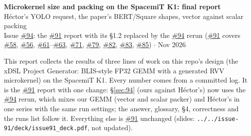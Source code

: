 \documentclass[10pt,a4paper]{article}
\newcommand{\iss}[1]{\href{https://github.com/JieGH/RVV_code_gen_via_MLIR_xDSL/issues/#1}{\##1}}
\begin{document}
\begin{center}
{\Large\bfseries Microkernel size and packing on the SpacemiT K1: final report}\\[4pt]
H\'ector's YOLO request, the paper's BERT/Square shapes, vector against scalar packing\\[2pt]
Issue \iss{94}: the \iss{91} report with its \S1.2 replaced by the \iss{94} rerun (\iss{91} covers \iss{58}, \iss{56}, \iss{61}--\iss{63}, \iss{71}, \iss{79}, \iss{82}, \iss{83}, \iss{85}) \quad$\cdot$ Nov 2026
\end{center}

\noindent This report collects the results of three lines of work on this repo's design (the xDSL Project Generator:
BLIS-style FP32 GEMM with a generated RVV microkernel) on the SpacemiT K1. Every number comes from a committed log. It is the \iss{91} report with one change: \S\ref{sec:94} (ours against H\'ector's) now uses the \iss{94} rerun, which mixes our GEMM (vector and scalar packer) and H\'ector's in one series with the same run settings; the answer, glossary, \S4, correctness and the runs list follow it. Everything else is \iss{91} unchanged (slides: \texttt{../../issue-91/deck/issue91\_deck.pdf}, not updated).







\end{document}
